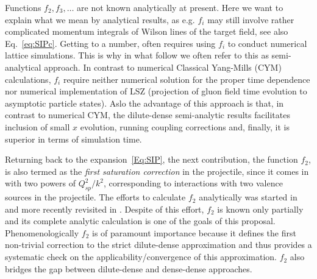 Functions $f_2 , f_3 , \ldots$ are
not known analytically at present.
Here we want to explain what we mean by  analytical results, 
as e.g. $f_i$ may still involve rather  complicated momentum integrals 
of  Wilson lines of the target field, see also Eq.~\eqref{eq:SIPc}. 
Getting to a number, often requires using $f_i$ to 
conduct numerical lattice simulations. This is why in what follow we 
often refer to this as semi-analytical approach. 
In contrast to numerical Classical Yang-Mills (CYM)
calculations, $f_i$ require neither numerical solution 
for the proper time dependence nor numerical implementation of 
LSZ (projection of gluon field time evolution to asymptotic particle states). 
Aslo the advantage of this approach is that, in contrast to numerical CYM, the dilute-dense semi-analytic 
results facilitates inclusion of small $x$ evolution, 
running coupling corrections and, finally, it is superior 
in terms of simulation time. 
 

Returning back to the expansion~\eqref{Eq:SIP},  
the next contribution, 
the function $f_2$, is  also termed as the {\it first saturation correction} in the
projectile, since it comes in with two powers of $Q_{sp}^2/k^2$,
corresponding to interactions with two valence sources in the projectile. 
The efforts to calculate $f_2$ analytically was started in
\myref\cite{Balitsky:2004rr} and more recently revisited in
\myref\cite{Chirilli:2015tea}. Despite of this effort,  $f_2$ is known only partially 
and its complete analytic calculation is one of the goals of this proposal. 
Phenomenologically $f_2$ is of paramount importance because it defines the first non-trivial 
correction to the strict dilute-dense approximation and thus provides a systematic
check on the applicability/convergence  of this approximation. 
$f_2$  also bridges the gap between dilute-dense and dense-dense 
approaches. 


 
